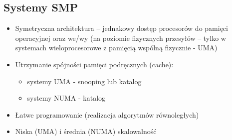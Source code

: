 \documentclass[a4paper,twoside]{article}
\begin{document}
		\subsection*{Systemy SMP}
		\begin{itemize}
			\item Symetryczna architektura – jednakowy dostęp procesorów do pamięci operacyjnej oraz we/wy (na poziomie fizycznych przesyłów –
			tylko w systemach wieloprocesorowe z pamięcią wspólną fizycznie - UMA)
			\item Utrzymanie spójności pamięci podręcznych (cache):
			\begin{itemize}
				\item systemy UMA - snooping lub katalog
				\item systemy NUMA - katalog
			\end{itemize}
			\item Łatwe programowanie (realizacja algorytmów równoległych)
			\item Niska (UMA) i średnia (NUMA) skalowalność
		\end{itemize}
	
\end{document}
